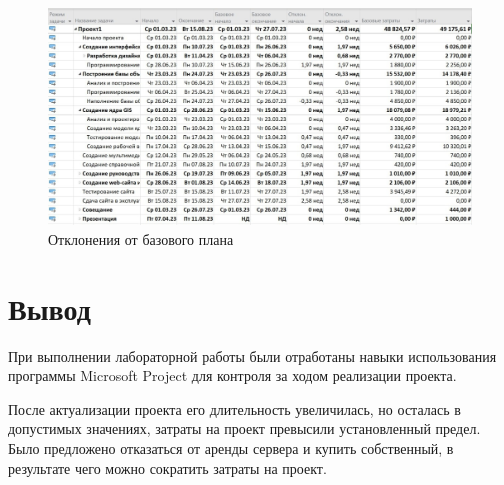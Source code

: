 \begin{figure}[H]
	\begin{center}
		\includegraphics[scale=0.3]{inc/img/result.jpg}
	\end{center}
	\captionsetup{justification=centering}
	\caption{Отклонения от базового плана}
	\label{img:result}
\end{figure}

\section*{Вывод}

При выполнении лабораторной работы были отработаны навыки использования программы Microsoft Project для контроля за ходом реализации проекта.

После актуализации проекта его длительность увеличилась, но осталась в допустимых значениях, затраты на проект превысили установленный предел. Было предложено отказаться от аренды сервера и купить собственный, в результате чего можно сократить затраты на проект.

